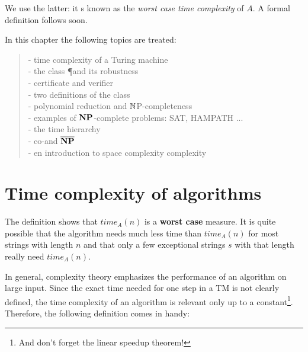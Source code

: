 We use the latter: it s known as the {\em worst case time complexity}
of $A$. A formal definition follows soon.

In this chapter the following topics are treated:

\begin{verse}
- time complexity of a Turing machine
\\
- the class \P and its robustness
\\
- certificate and verifier
\\
- two definitions of the class \NP
\\
- polynomial reduction and $\mathbb{N}$P-completeness
\\
- examples of ${\bf NP}$-complete problems: SAT, HAMPATH ...
\\
- the time hierarchy
\\
- co-\NP and $\overline{{\bf NP}}$
\\
- en introduction to space complexity
complexity
\end{verse}




\section{Time complexity of algorithms}
 

The definition shows that $time_A(n)$ is a {\bf worst case}
measure. It is quite possible that the algorithm needs much less time
than $time_A(n)$ for most strings with length $n$ and that only a few
exceptional strings $s$ with that length really need $time_A(n)$.

In general, complexity theory emphasizes the performance of an
algorithm on large input. Since the exact time needed for one step in
a TM is not clearly defined, the time complexity of an algorithm is
relevant only up to a constant\footnote{And don't forget the linear
  speedup theorem!}. Therefore, the following definition comes in
handy:

